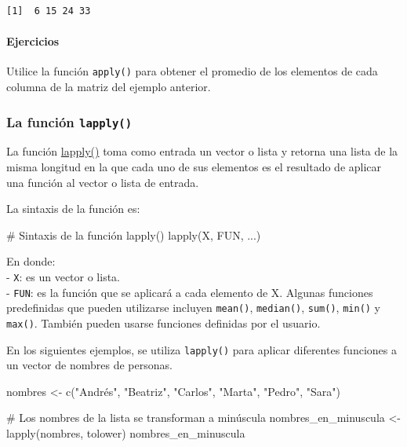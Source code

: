 \documentclass[
  letterpaper,
  DIV=11,
  numbers=noendperiod]{scrreprt}
\let\oldparagraph\paragraph
\renewcommand{\paragraph}[1]{\oldparagraph{#1}\mbox{}}
\newenvironment{Shaded}{\begin{snugshade}}{\end{snugshade}}
\newcommand{\CommentTok}[1]{\textcolor[rgb]{0.37,0.37,0.37}{#1}}
\newcommand{\FunctionTok}[1]{\textcolor[rgb]{0.28,0.35,0.67}{#1}}
\newcommand{\NormalTok}[1]{\textcolor[rgb]{0.00,0.23,0.31}{#1}}
\newcommand{\OtherTok}[1]{\textcolor[rgb]{0.00,0.23,0.31}{#1}}
\newcommand{\StringTok}[1]{\textcolor[rgb]{0.13,0.47,0.30}{#1}}
\begin{document}
\begin{verbatim}
[1]  6 15 24 33
\end{verbatim}

\hypertarget{ejercicios-9}{%
\paragraph{Ejercicios}\label{ejercicios-9}}

Utilice la función \texttt{apply()} para obtener el promedio de los
elementos de cada columna de la matriz del ejemplo anterior.

\hypertarget{la-funciuxf3n-lapply}{%
\subsubsection{\texorpdfstring{La función
\texttt{lapply()}}{La función lapply()}}\label{la-funciuxf3n-lapply}}

La función \href{https://rdrr.io/r/base/lapply.html}{lapply()} toma como
entrada un vector o lista y retorna una lista de la misma longitud en la
que cada uno de sus elementos es el resultado de aplicar una función al
vector o lista de entrada.

La sintaxis de la función es:

\begin{Shaded}
\begin{Highlighting}[]
\CommentTok{\# Sintaxis de la función lapply()}
\FunctionTok{lapply}\NormalTok{(X, FUN, ...)}
\end{Highlighting}
\end{Shaded}

En donde:\\
- \texttt{X}: es un vector o lista.\\
- \texttt{FUN}: es la función que se aplicará a cada elemento de X.
Algunas funciones predefinidas que pueden utilizarse incluyen
\texttt{mean()}, \texttt{median()}, \texttt{sum()}, \texttt{min()} y
\texttt{max()}. También pueden usarse funciones definidas por el
usuario.

En los siguientes ejemplos, se utiliza \texttt{lapply()} para aplicar
diferentes funciones a un vector de nombres de personas.

\begin{Shaded}
\begin{Highlighting}[]
\NormalTok{nombres }\OtherTok{\textless{}{-}} \FunctionTok{c}\NormalTok{(}\StringTok{"Andrés"}\NormalTok{, }\StringTok{"Beatriz"}\NormalTok{, }\StringTok{"Carlos"}\NormalTok{, }\StringTok{"Marta"}\NormalTok{, }\StringTok{"Pedro"}\NormalTok{, }\StringTok{"Sara"}\NormalTok{)}

\CommentTok{\# Los nombres de la lista se transforman a minúscula}
\NormalTok{nombres\_en\_minuscula }\OtherTok{\textless{}{-}} \FunctionTok{lapply}\NormalTok{(nombres, tolower)}
\NormalTok{nombres\_en\_minuscula}
\end{Highlighting}
\end{Shaded}
\end{document}
